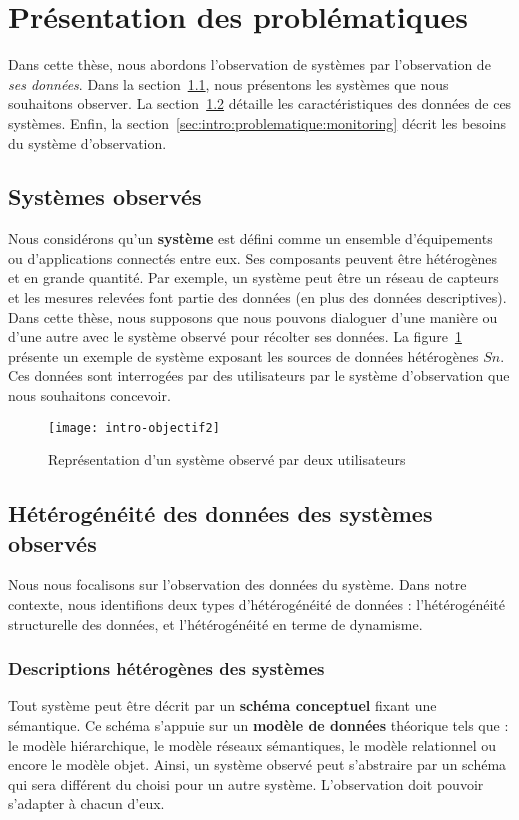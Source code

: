 \section{Présentation des problématiques}\label{sec:intro:problematique}
Dans cette thèse, nous abordons l'observation de systèmes par l'observation de \textit{ses données}. Dans la section~\ref{sec:intro:problematique:system}, nous présentons les systèmes que nous souhaitons observer. La section~\ref{sec:intro:problematique:data} détaille les caractéristiques des données de ces systèmes. Enfin, la section~\ref{sec:intro:problematique:monitoring} décrit les besoins du système d'observation.

\subsection{Systèmes observés}\label{sec:intro:problematique:system}
Nous considérons qu'un \textbf{système} est défini comme un ensemble d'équipements ou d'applications connectés entre eux. Ses composants peuvent être hétérogènes et en grande quantité. Par exemple, un système peut être un réseau de capteurs et les mesures relevées font partie des données (en plus des données descriptives). Dans cette thèse, nous supposons que nous pouvons dialoguer d'une manière ou d'une autre avec le système observé pour récolter ses données. La figure~\ref{fig:intro:objectif:abstraction} présente un exemple de système exposant les sources de données hétérogènes $Sn$. Ces données sont interrogées par des utilisateurs par le système d'observation que nous souhaitons concevoir.

\begin{figure}[ht]
\centering
\texttt{[image: intro-objectif2]}
\caption{Représentation d'un système observé par deux utilisateurs}\label{fig:intro:objectif:abstraction}
\end{figure}

\subsection{Hétérogénéité des données des systèmes observés}\label{sec:intro:problematique:data}
Nous nous focalisons sur l'observation des données du système. Dans notre contexte, nous identifions deux types d'hétérogénéité de données : l'hétérogénéité structurelle des données, et l'hétérogénéité en terme de dynamisme.
\subsubsection{Descriptions hétérogènes des systèmes}
Tout système peut être décrit par un \textbf{schéma conceptuel} fixant une sémantique. Ce schéma s'appuie sur un \textbf{modèle de données} théorique tels que : le modèle hiérarchique, le modèle réseaux sémantiques, le modèle relationnel ou encore le modèle objet. Ainsi, un système observé peut s'abstraire par un schéma qui sera différent du choisi pour un autre système. L'observation doit pouvoir s'adapter à chacun d'eux.

